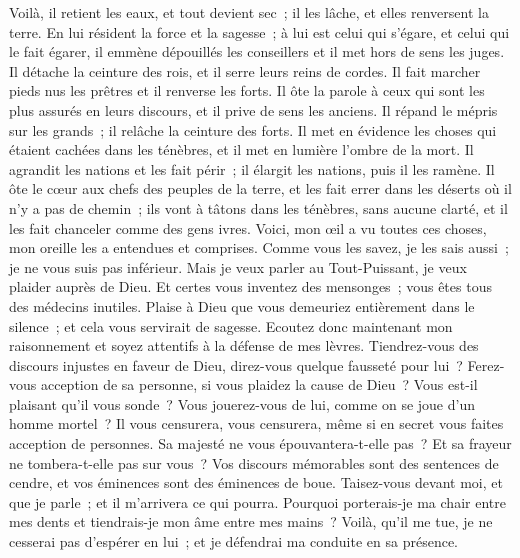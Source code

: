 \begin{multicols}{2}
Voilà, il retient les eaux, et tout devient sec~; il les lâche, et elles renversent la terre.
En lui résident la force et la sagesse~; à lui est celui qui s'égare, et celui qui le fait égarer,
il emmène dépouillés les conseillers et il met hors de sens les juges.
Il détache la ceinture des rois, et il serre leurs reins de cordes.
Il fait marcher pieds nus les prêtres et il renverse les forts.
Il ôte la parole à ceux qui sont les plus assurés en leurs discours, et il prive de sens les anciens.
Il répand le mépris sur les grands~; il relâche la ceinture des forts.
Il met en évidence les choses qui étaient cachées dans les ténèbres, et il met en lumière l'ombre de la mort.
 Il agrandit les nations et les fait périr~; il élargit les nations, puis il les ramène. 
Il ôte le cœur aux chefs des peuples de la terre, et les fait errer dans les déserts où il n'y a pas de chemin~;
ils vont à tâtons dans les ténèbres, sans aucune clarté, et il les fait chanceler comme des gens ivres. 
\VerseOne{}Voici, mon œil a vu toutes ces choses, mon oreille les a entendues et comprises.
Comme vous les savez, je les sais aussi~; je ne vous suis pas inférieur. 
Mais je veux parler au Tout-Puissant, je veux plaider auprès de Dieu.
Et certes vous inventez des mensonges~; vous êtes tous des médecins inutiles.
Plaise à Dieu que vous demeuriez entièrement dans le silence~; et cela vous servirait de sagesse.
Ecoutez donc maintenant mon raisonnement et soyez attentifs à la défense de mes lèvres.
Tiendrez-vous des discours injustes en faveur de Dieu, direz-vous quelque fausseté pour lui~? 
Ferez-vous acception de sa personne, si vous plaidez la cause de Dieu~? 
Vous est-il plaisant qu'il vous sonde~? Vous jouerez-vous de lui, comme on se joue d'un homme mortel~? 
Il vous censurera, vous censurera, même si en secret vous faites acception de personnes.
Sa majesté ne vous épouvantera-t-elle pas~? Et sa frayeur ne tombera-t-elle pas sur vous~? 
Vos discours mémorables sont des sentences de cendre, et vos éminences sont des éminences de boue. 
Taisez-vous devant moi, et que je parle~; et il m'arrivera ce qui pourra. 
Pourquoi porterais-je ma chair entre mes dents et tiendrais-je mon âme entre mes mains~?
Voilà, qu'il me tue, je ne cesserai pas d'espérer en lui~; et je défendrai ma conduite en sa présence.

\end{multicols}
